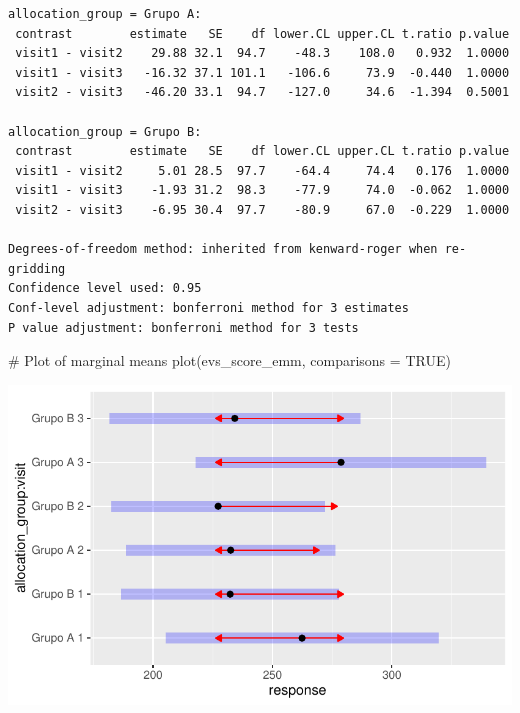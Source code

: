 \documentclass[
  12pt,
]{article}
\newenvironment{Shaded}{\begin{snugshade}}{\end{snugshade}}
\newcommand{\AttributeTok}[1]{\textcolor[rgb]{0.40,0.45,0.13}{#1}}
\newcommand{\CommentTok}[1]{\textcolor[rgb]{0.37,0.37,0.37}{#1}}
\newcommand{\ConstantTok}[1]{\textcolor[rgb]{0.56,0.35,0.01}{#1}}
\newcommand{\FunctionTok}[1]{\textcolor[rgb]{0.28,0.35,0.67}{#1}}
\newcommand{\NormalTok}[1]{\textcolor[rgb]{0.00,0.23,0.31}{#1}}
\begin{document}
\begin{verbatim}
allocation_group = Grupo A:
 contrast        estimate   SE    df lower.CL upper.CL t.ratio p.value
 visit1 - visit2    29.88 32.1  94.7    -48.3    108.0   0.932  1.0000
 visit1 - visit3   -16.32 37.1 101.1   -106.6     73.9  -0.440  1.0000
 visit2 - visit3   -46.20 33.1  94.7   -127.0     34.6  -1.394  0.5001

allocation_group = Grupo B:
 contrast        estimate   SE    df lower.CL upper.CL t.ratio p.value
 visit1 - visit2     5.01 28.5  97.7    -64.4     74.4   0.176  1.0000
 visit1 - visit3    -1.93 31.2  98.3    -77.9     74.0  -0.062  1.0000
 visit2 - visit3    -6.95 30.4  97.7    -80.9     67.0  -0.229  1.0000

Degrees-of-freedom method: inherited from kenward-roger when re-gridding 
Confidence level used: 0.95 
Conf-level adjustment: bonferroni method for 3 estimates 
P value adjustment: bonferroni method for 3 tests 
\end{verbatim}

\begin{Shaded}
\begin{Highlighting}[]
\CommentTok{\# Plot of marginal means}
\FunctionTok{plot}\NormalTok{(evs\_score\_emm, }\AttributeTok{comparisons =} \ConstantTok{TRUE}\NormalTok{)}
\end{Highlighting}
\end{Shaded}

\includegraphics{Outcomes_files/figure-pdf/evs_score_sens_emm-1.pdf}
\end{document}
